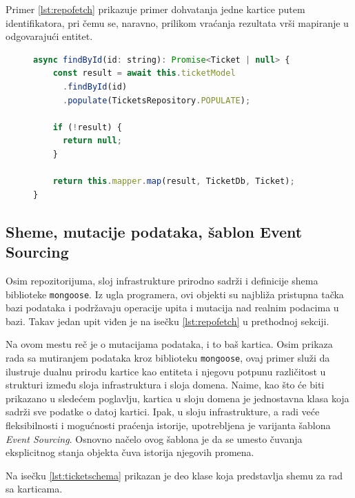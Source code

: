 \documentclass[12pt,oneside]{memoir}
\begin{document}
\newpage
Primer \ref{lst:repofetch} prikazuje primer dohvatanja jedne kartice putem identifikatora, pri čemu se, naravno, prilikom vraćanja rezultata vrši mapiranje u odgovarajući entitet.

\begin{figure}[h]
\begin{lstlisting}[language=JavaScript, style=ES6, caption={Dohvatanje jednog entiteta.},label={lst:repofetch}]
async findById(id: string): Promise<Ticket | null> {
    const result = await this.ticketModel
      .findById(id)
      .populate(TicketsRepository.POPULATE);
    
    if (!result) {
      return null;
    }
    
    return this.mapper.map(result, TicketDb, Ticket);
}
\end{lstlisting}
\end{figure}

\newpage
\subsection{Sheme, mutacije podataka, šablon Event Sourcing}
\label{sec:eventsourcing}
Osim repozitorijuma, sloj infrastrukture prirodno sadrži i definicije shema biblioteke \verb|mongoose|. Iz ugla programera, ovi objekti su najbliža pristupna tačka bazi podataka i podržavaju operacije upita i mutacija nad realnim podacima u bazi. Takav jedan upit viđen je na isečku \ref{lst:repofetch} u prethodnoj sekciji.

Na ovom mestu reč je o mutacijama podataka, i to baš kartica. Osim prikaza rada sa mutiranjem podataka kroz biblioteku \verb|mongoose|, ovaj primer služi da ilustruje dualnu prirodu kartice kao entiteta i njegovu potpunu različitost u strukturi između sloja infrastruktura i sloja domena. Naime, kao što će biti prikazano u sledećem poglavlju, kartica u sloju domena je jednostavna klasa koja sadrži sve podatke o datoj kartici. Ipak, u sloju infrastrukture, a radi veće fleksibilnosti i mogućnosti praćenja istorije, upotrebljena je varijanta šablona \textit{Event Sourcing}. Osnovno načelo ovog šablona je da se umesto čuvanja eksplicitnog stanja objekta čuva istorija njegovih promena.

Na isečku \ref{lst:ticketschema} prikazan je deo klase koja predstavlja shemu za rad sa karticama.
\end{document}
